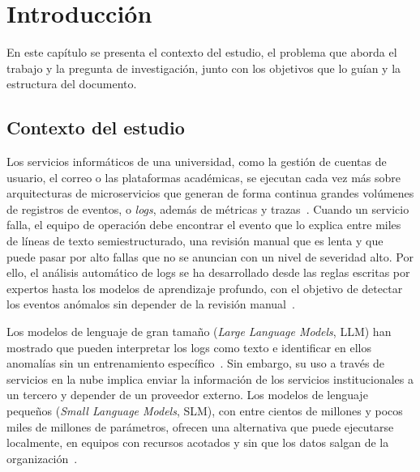 \chapter{Introducción}\label{cap:introduccion}

En este capítulo se presenta el contexto del estudio, el problema que aborda el trabajo y la pregunta de investigación, junto con los objetivos que lo guían y la estructura del documento.

\section{Contexto del estudio}\label{sec:contexto}

Los servicios informáticos de una universidad, como la gestión de cuentas de usuario, el correo o las plataformas académicas, se ejecutan cada vez más sobre arquitecturas de microservicios que generan de forma continua grandes volúmenes de registros de eventos, o \textit{logs}, además de métricas y trazas~\cite{uddin2026_microservice_logs}. Cuando un servicio falla, el equipo de operación debe encontrar el evento que lo explica entre miles de líneas de texto semiestructurado, una revisión manual que es lenta y que puede pasar por alto fallas que no se anuncian con un nivel de severidad alto. Por ello, el análisis automático de logs se ha desarrollado desde las reglas escritas por expertos hasta los modelos de aprendizaje profundo, con el objetivo de detectar los eventos anómalos sin depender de la revisión manual~\cite{he2021_survey}.

Los modelos de lenguaje de gran tamaño (\textit{Large Language Models}, LLM) han mostrado que pueden interpretar los logs como texto e identificar en ellos anomalías sin un entrenamiento específico~\cite{liu2024_logprompt}. Sin embargo, su uso a través de servicios en la nube implica enviar la información de los servicios institucionales a un tercero y depender de un proveedor externo. Los modelos de lenguaje pequeños (\textit{Small Language Models}, SLM), con entre cientos de millones y pocos miles de millones de parámetros, ofrecen una alternativa que puede ejecutarse localmente, en equipos con recursos acotados y sin que los datos salgan de la organización~\cite{wang2025_slm_survey}.

